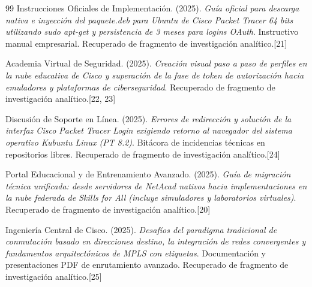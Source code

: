 \documentclass[a4paper,12pt]{article}
\begin{document}
\begin{thebibliography}{99}
Instrucciones Oficiales de Implementación. (2025). \textit{Guía oficial para descarga nativa e inyección del paquete.deb para Ubuntu de Cisco Packet Tracer 64 bits utilizando sudo apt-get y persistencia de 3 meses para logins OAuth}. Instructivo manual empresarial. Recuperado de fragmento de investigación analítico.[21]

Academia Virtual de Seguridad. (2025). \textit{Creación visual paso a paso de perfiles en la nube educativa de Cisco y superación de la fase de token de autorización hacia emuladores y plataformas de ciberseguridad}. Recuperado de fragmento de investigación analítico.[22, 23]

Discusión de Soporte en Línea. (2025). \textit{Errores de redirección y solución de la interfaz Cisco Packet Tracer Login exigiendo retorno al navegador del sistema operativo Kubuntu Linux (PT 8.2)}. Bitácora de incidencias técnicas en repositorios libres. Recuperado de fragmento de investigación analítico.[24]

Portal Educacional y de Entrenamiento Avanzado. (2025). \textit{Guía de migración técnica unificada: desde servidores de NetAcad nativos hacia implementaciones en la nube federada de Skills for All (incluye simuladores y laboratorios virtuales)}. Recuperado de fragmento de investigación analítico.[20]

Ingeniería Central de Cisco. (2025). \textit{Desafíos del paradigma tradicional de conmutación basado en direcciones destino, la integración de redes convergentes y fundamentos arquitectónicos de MPLS con etiquetas}. Documentación y presentaciones PDF de enrutamiento avanzado. Recuperado de fragmento de investigación analítico.[25]

\end{thebibliography}
\end{document}
